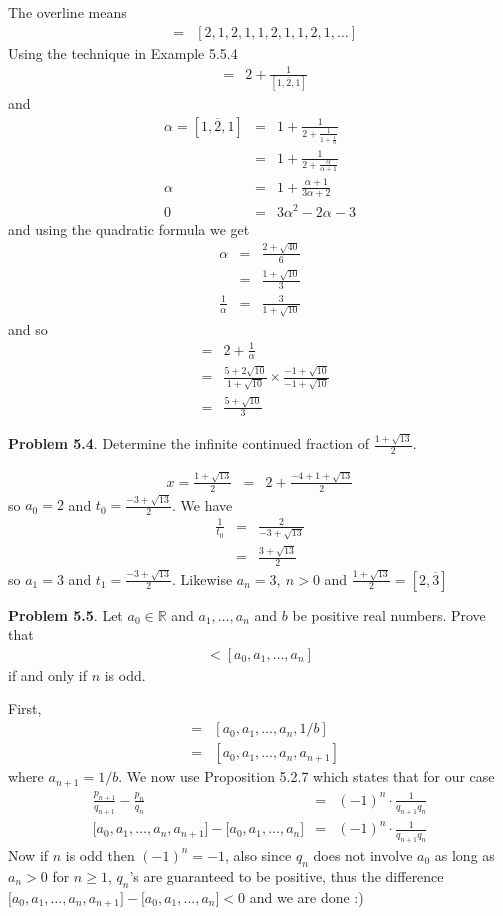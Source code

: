 \documentclass[aps,preprint,preprintnumbers,nofootinbib,showpacs,prd]{revtex4-1}
\newcommand{\nbea}{\begin{eqnarray*}}
\newcommand{\neea}{\end{eqnarray*}}
\begin{document}
The overline means
%
\nbea
[2, \overline{1, 2, 1}] & = & [2, 1, 2, 1, 1, 2, 1, 1, 2, 1, \dots]
\neea
%
Using the technique in Example 5.5.4
%
\nbea
[2, \overline{1, 2, 1}] & = & 2 + \frac{1}{[\overline{1, 2, 1}] }
\neea
%
and
%
\nbea
\alpha = [\overline{1, 2, 1}] & = & 1 + \frac{1}{2 + \frac{1}{1 + \frac{1}{\alpha}}} \\
& = & 1 + \frac{1}{2 + \frac{\alpha}{\alpha + 1}} \\
\alpha & = & 1 + \frac{\alpha + 1}{3 \alpha + 2} \\
0 & = & 3\alpha^2 - 2\alpha-3
\neea
%
and using the quadratic formula we get
%
\nbea
\alpha & = & \frac{2+\sqrt{40}}{6} \\
& = & \frac{1+\sqrt{10}}{3} \\
\frac{1}{\alpha} & = & \frac{3}{1 + \sqrt{10}}
\neea
%
and so
%
\nbea
[2, \overline{1, 2, 1}] & = & 2 + \frac{1}{\alpha} \\
& = & \frac{5 + 2\sqrt{10}}{1 + \sqrt{10}} \times \frac{-1 + \sqrt{10}}{-1 + \sqrt{10}} \\
& = & \frac{5 +\sqrt{10}}{3}
\neea
%

{\bf Problem 5.4}. Determine the infinite continued fraction of $\frac{1+\sqrt{13}}{2}$.

%
\nbea
x = \frac{1+\sqrt{13}}{2} & = & 2 + \frac{-4 +1+\sqrt{13}}{2}
\neea
%
so $a_0 = 2$ and $t_0 = \frac{-3+\sqrt{13}}{2}$. We have
%
\nbea
\frac{1}{t_0} & = & \frac{2}{-3+\sqrt{13}} \\
& = & \frac{3 + \sqrt{13}}{2}
\neea
%
so $a_1 = 3$ and $t_1 = \frac{-3+\sqrt{13}}{2}$. Likewise $a_n = 3, ~n > 0$ and $\frac{1+\sqrt{13}}{2} = [2,\overline{3}]$

{\bf Problem 5.5}. Let $a_0 \in \mathbb{R}$ and $a_1 , \dots , a_n$ and $b$ be positive real numbers. Prove that
%
\nbea
[a_0 , a_1 , \dots , a_n + b] < [a_0 , a_1 , \dots , a_n ]
\neea
%
if and only if $n$ is odd.

First,
%
\nbea
[a_0 , a_1 , \dots , a_n + b] & = & [a_0 , a_1 , \dots , a_n , 1/b] \\
& = & [a_0 , a_1 , \dots , a_n, a_{n+1}]
\neea
%
where $a_{n+1} = 1/b$. We now use Proposition 5.2.7 which states that for our case
%
\nbea
\frac{p_{n+1}}{q_{n+1}} - \frac{p_{n}}{q_{n}} & = & (-1)^{n}\cdot \frac{1}{q_{n+1} q_{n}} \\
\lbrack a_0 , a_1 , \dots , a_n, a_{n+1}\rbrack - \lbrack a_0 , a_1 , \dots , a_n\rbrack & = & (-1)^{n}\cdot \frac{1}{q_{n+1} q_{n}}
\neea
%
Now if $n$ is odd then $(-1)^n = -1$, also since $q_n$ does not involve $a_0$ as long as $a_n > 0$ for $n \ge 1$, $q_n$'s are guaranteed to be positive, thus the difference $\lbrack a_0 , a_1 , \dots , a_n, a_{n+1}\rbrack - \lbrack a_0 , a_1 , \dots , a_n\rbrack < 0$ and we are done :)
\end{document}
